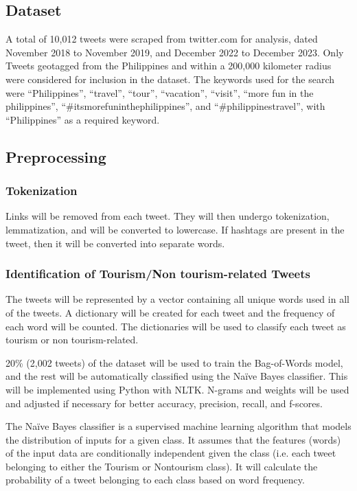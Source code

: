 \documentclass[journal]{./IEEE/IEEEtran}
\begin{document}
\subsection{Dataset}
A total of 10,012 tweets were scraped from twitter.com for analysis, dated November 2018 to November 2019, and December 2022 to December 2023. Only Tweets geotagged from the Philippines and within a 200,000 kilometer radius were considered for inclusion in the dataset. The keywords used for the search were “Philippines”, “travel”, “tour”, “vacation”, “visit”, “more fun in the philippines”, “\#itsmorefuninthephilippines”, and “\#philippinestravel”, with “Philippines” as a required keyword. 


\subsection{Preprocessing}
\subsubsection{Tokenization}
Links will be removed from each tweet. They will then undergo tokenization, lemmatization, and will be converted to lowercase. If hashtags are present in the tweet, then it will be converted into separate words. 
\subsubsection{Identification of Tourism/Non tourism-related Tweets}
The tweets will be represented by a vector containing all unique words used in all of the tweets. A dictionary will be created for each tweet and the frequency of each word will be counted. The dictionaries will be used to classify each tweet as tourism or non tourism-related. 

	20\% (2,002 tweets) of the dataset will be used to train the Bag-of-Words model, and the rest will be automatically classified using the Naïve Bayes classifier. This will be implemented using Python with NLTK. N-grams and weights will be used and adjusted if necessary for better accuracy, precision, recall, and f-scores. 

	The Naïve Bayes classifier is a supervised machine learning algorithm that models the distribution of inputs for a given class. It assumes that the features (words) of the input data are conditionally independent given the class (i.e. each tweet belonging to either the Tourism or Nontourism class). It will calculate the probability of a tweet belonging to each class based on word frequency. \cite{ten:analyticsvidhya-naive-bayes}
\end{document}
